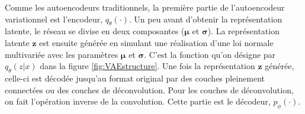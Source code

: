  Comme les autoencodeurs traditionnels, la première partie de l'autoencodeur variationnel est l'encodeur, $q_{\theta}(\cdot)$. Un peu avant d'obtenir la représentation latente, le réseau se divise en deux composantes ($\boldsymbol \mu$ et $\boldsymbol \sigma$). La représentation latente $\boldsymbol{z}$ est ensuite générée en simulant une réalisation d'une loi normale multivariée avec les paramètres $\boldsymbol \mu$ et $\boldsymbol \sigma$. C'est la fonction qu'on désigne par $q_{\theta}(z|x)$ dans la figure \ref{fig:VAEstructure}. Une fois la représentation $\boldsymbol{z}$ générée, celle-ci est décodée jusqu'au format original par des couches pleinement connectées ou des couches de déconvolution. Pour les couches de déconvolution, on fait l'opération inverse de la convolution. Cette partie est le décodeur, $p_{\phi}(\cdot)$.

